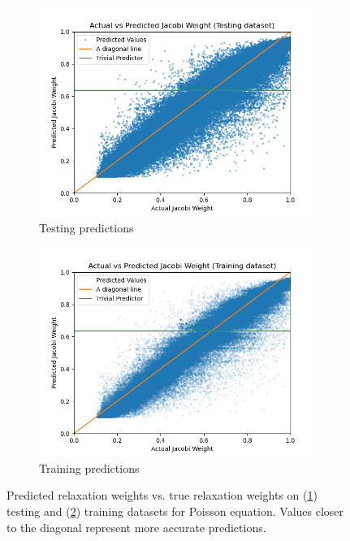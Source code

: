 \documentclass[review]{siamart190516}
\begin{document}
\begin{figure}[h]
  \centering
  \begin{subfigure}{.48\textwidth}
    \includegraphics[width=\textwidth]{figs/poisson_jacobi_test_pred.png}
    \caption{Testing predictions}
    \label{subfig:poisson_jacobi_test}
  \end{subfigure}
  \begin{subfigure}{.48\textwidth}
    \includegraphics[width=\textwidth]{figs/poisson_jacobi_train_pred.png}
    \caption{Training predictions}
    \label{subfig:poisson_jacobi_train}
  \end{subfigure}
  \caption{ Predicted relaxation weights vs. true relaxation weights on (\ref{subfig:poisson_jacobi_test}) testing and (\ref{subfig:poisson_jacobi_train}) training datasets for Poisson equation. Values closer to the diagonal represent more accurate predictions. }
  \label{fig:poisson_jacobi_pred}
\end{figure}
\end{document}
